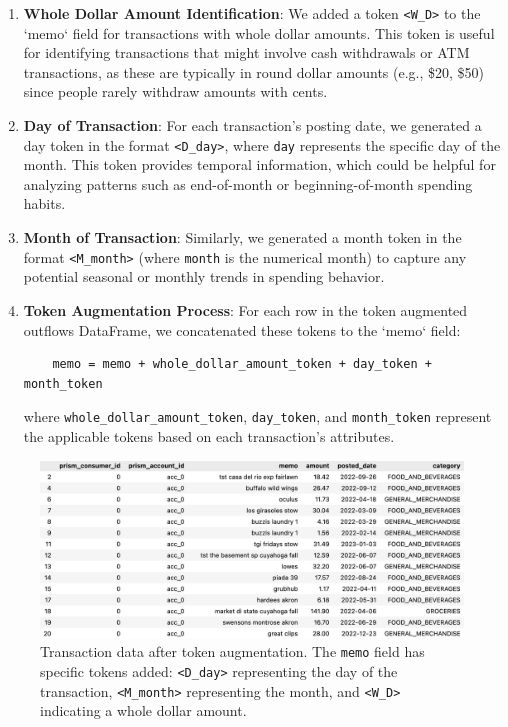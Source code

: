 \documentclass[12pt,letterpaper]{article}
\begin{document}
\begin{enumerate}
    \item \textbf{Whole Dollar Amount Identification}: We added a token \texttt{<W\_D>} to the `memo` field for transactions with whole dollar amounts. This token is useful for identifying transactions that might involve cash withdrawals or ATM transactions, as these are typically in round dollar amounts (e.g., \$20, \$50) since people rarely withdraw amounts with cents.

    \item \textbf{Day of Transaction}: For each transaction's posting date, we generated a day token in the format \texttt{<D\_day>}, where \texttt{day} represents the specific day of the month. This token provides temporal information, which could be helpful for analyzing patterns such as end-of-month or beginning-of-month spending habits.

    \item \textbf{Month of Transaction}: Similarly, we generated a month token in the format \texttt{<M\_month>} (where \texttt{month} is the numerical month) to capture any potential seasonal or monthly trends in spending behavior.

    \item \textbf{Token Augmentation Process}: For each row in the token augmented outflows DataFrame, we concatenated these tokens to the `memo` field:

    \begin{verbatim}
    memo = memo + whole_dollar_amount_token + day_token + month_token
    \end{verbatim}

    where \texttt{whole\_dollar\_amount\_token}, \texttt{day\_token}, and \texttt{month\_token} represent the applicable tokens based on each transaction's attributes.

\end{enumerate}

\begin{figure}[h]
    \centering
    \includegraphics[width=\textwidth]{figure/post_token.jpeg}
    \caption{Transaction data after token augmentation. The \texttt{memo} field has specific tokens added: \texttt{<D\_day>} representing the day of the transaction, \texttt{<M\_month>} representing the month, and \texttt{<W\_D>} indicating a whole dollar amount.}
    \label{fig:token_augmented_data}
\end{figure}
\end{document}
